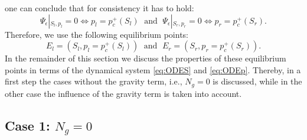 \documentclass[smallextended]{svjour3}       %
\begin{document}
one can conclude that for consistency it has to hold:
$$
\Psi_\epsilon \left|_{S_l,p_l}  = 0 \right. \Leftrightarrow p_l = p_c^+\left(S_l \right) \; \text{ and } \;
\Psi_\epsilon \left|_{S_r,p_r} = 0 \right. \Leftrightarrow p_r = p_c^+\left(S_r \right).
$$
Therefore, we use the following equilibrium points:
$$
E_l = \left(S_l,  p_l = p_c^+\left(S_l \right) \right) \;\text{ and }\; E_r = \left(S_r,  p_r = p_c^+\left( S_r \right) \right).
$$
In the remainder of this section we discuss the properties of these equilibrium points in terms of the dynamical system \eqref{eq:ODES} and \eqref{eq:ODEp}. 
Thereby, in a first step the cases without the gravity term, i.e., $N_g = 0$ is discussed, while in the other case the influence of the gravity term is taken into 
account.

\subsection{Case 1: $N_g = 0$}
\end{document}
